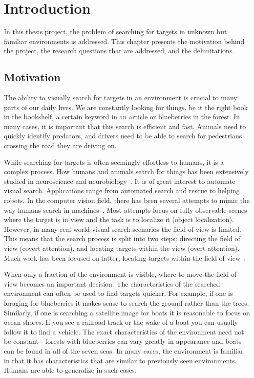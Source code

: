 \chapter{Introduction}
\label{cha:introduction}

In this thesis project, the problem of searching for targets in unknown but familiar environments is addressed. This chapter presents the motivation behind the project, the research questions that are addressed, and the delimitations. 


\section{Motivation}
\label{sec:motivation}

The ability to visually search for targets in an environment is crucial to many parts of our daily lives. We are constantly looking for things, be it the right book in the bookshelf, a certain keyword in an article or blueberries in the forest. In many cases, it is important that this search is efficient and fast. Animals need to quickly identify predators, and drivers need to be able to search for pedestrians crossing the road they are driving on.

While searching for targets is often seemingly effortless to humans, it is a complex process. How humans and animals search for things has been extensively studied in neuroscience and neurobiology~\cite{eckstein_visual_2011,wolfe_visual_2010,wolfe_guided_2021}. It is of great interest to automate visual search. Applications range from automated search and rescue to helping robots. In the computer vision field, there has been several attempts to mimic the way humans search in machines~\cite{}. Most attempts focus on fully observable scenes where the target is in view and the task is to localize it (object localization). However, in many real-world visual search scenarios the field-of-view is limited. This means that the search process is split into two steps: directing the field of view (covert attention), and locating targets within the view (overt attention). Much work has been focused on latter, locating targets within the field of view~\cite{}. 

When only a fraction of the environment is visible, where to move the field of view becomes an important decision. The characteristics of the searched environment can often be used to find targets quicker. For example, if one is foraging for blueberries it makes sense to search the ground rather than the trees. Similarly, if one is searching a satellite image for boats it is reasonable to focus on ocean shores. If you see a railroad track or the wake of a boat you can usually follow it to find a vehicle. The exact characteristics of the environment need not be constant - forests with blueberries can vary greatly in appearance and boats can be found in all of the seven seas. In many cases, the environment is familiar in that it has characteristics that are similar to previously seen environments. Humans are able to generalize in such cases.

